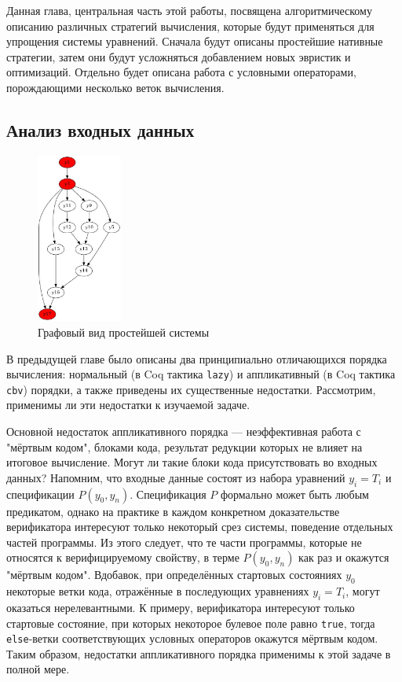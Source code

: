 \documentclass[../diploma.tex]{subfiles}
\begin{document}
\label{sec:2}
\graphicspath{ {../images/} }

Данная глава, центральная часть этой работы, посвящена алгоритмическому описанию различных стратегий вычисления, которые будут применяться для упрощения системы уравнений. Сначала будут описаны простейшие нативные стратегии, затем они будут усложняться добавлением новых эвристик и оптимизаций. Отдельно будет описана работа с условными операторами, порождающими несколько веток вычисления.

\subsection{Анализ входных данных}\label{analysis}

\begin{figure}
    \centering
    \includegraphics[width=0.25\textwidth]{graph_simple1.jpeg}
    \caption{Графовый вид простейшей системы}\label{graph_simple1}
\end{figure}

В предыдущей главе было описаны два принципиально отличающихся порядка вычисления: нормальный (в Coq тактика \texttt{lazy}) и аппликативный (в Coq тактика \texttt{cbv}) порядки, а также приведены их существенные недостатки. Рассмотрим, применимы ли эти недостатки к изучаемой задаче.

Основной недостаток аппликативного порядка --- неэффективная работа с "мёртвым кодом", блоками кода, результат редукции которых не влияет на итоговое вычисление. Могут ли такие блоки кода присутствовать во входных данных? Напомним, что входные данные состоят из набора уравнений $y_i = T_i$ и спецификации $P(y_0, y_n)$. Спецификация $P$ формально может быть любым предикатом, однако на практике в каждом конкретном доказательстве верификатора интересуют только некоторый срез системы, поведение отдельных частей программы. Из этого следует, что те части программы, которые не относятся к верифицируемому свойству, в терме $P(y_0, y_n)$ как раз и окажутся "мёртвым кодом". Вдобавок, при определённых стартовых состояниях $y_0$ некоторые ветки кода, отражённые в последующих уравнениях $y_i = T_i$, могут оказаться нерелевантными. К примеру, верификатора интересуют только стартовые состояние, при которых некоторое булевое поле равно \texttt{true}, тогда \texttt{else}-ветки соответствующих условных операторов окажутся мёртвым кодом. Таким образом, недостатки аппликативного порядка применимы к этой задаче в полной мере.
\end{document}
